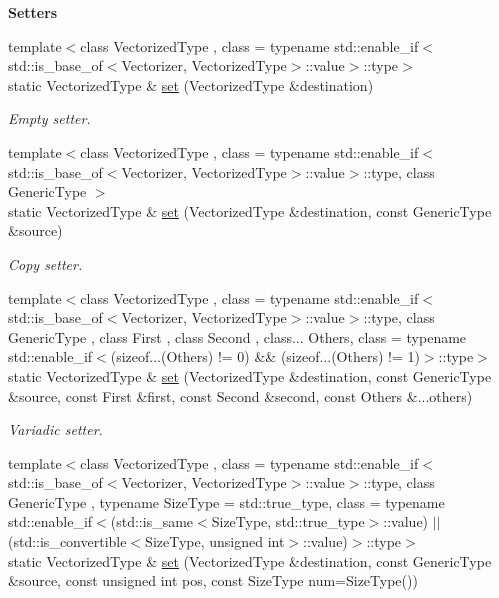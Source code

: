 \begin{Indent}{\bf Setters}\par
\begin{DoxyCompactItemize}
\item 
{\footnotesize template$<$class Vectorized\-Type , class  = typename std\-::enable\-\_\-if$<$std\-::is\-\_\-base\-\_\-of$<$\-Vectorizer, Vectorized\-Type$>$\-::value$>$\-::type$>$ }\\static Vectorized\-Type \& \hyperlink{classmagrathea_1_1Vectorizer_a67836bbf5aced8fee531fd2caf839f15}{set} (Vectorized\-Type \&destination)
\begin{DoxyCompactList}\small\item\em Empty setter. \end{DoxyCompactList}\item 
{\footnotesize template$<$class Vectorized\-Type , class  = typename std\-::enable\-\_\-if$<$std\-::is\-\_\-base\-\_\-of$<$\-Vectorizer, Vectorized\-Type$>$\-::value$>$\-::type, class Generic\-Type $>$ }\\static Vectorized\-Type \& \hyperlink{classmagrathea_1_1Vectorizer_aa586478d9b24b19586ff1d6dfdff5b68}{set} (Vectorized\-Type \&destination, const Generic\-Type \&source)
\begin{DoxyCompactList}\small\item\em Copy setter. \end{DoxyCompactList}\item 
{\footnotesize template$<$class Vectorized\-Type , class  = typename std\-::enable\-\_\-if$<$std\-::is\-\_\-base\-\_\-of$<$\-Vectorizer, Vectorized\-Type$>$\-::value$>$\-::type, class Generic\-Type , class First , class Second , class... Others, class  = typename std\-::enable\-\_\-if$<$(sizeof...(\-Others) != 0) \&\& (sizeof...(\-Others) != 1)$>$\-::type$>$ }\\static Vectorized\-Type \& \hyperlink{classmagrathea_1_1Vectorizer_ab181cd6d6a7afb777ebab551cc36bc33}{set} (Vectorized\-Type \&destination, const Generic\-Type \&source, const First \&first, const Second \&second, const Others \&...others)
\begin{DoxyCompactList}\small\item\em Variadic setter. \end{DoxyCompactList}\item 
{\footnotesize template$<$class Vectorized\-Type , class  = typename std\-::enable\-\_\-if$<$std\-::is\-\_\-base\-\_\-of$<$\-Vectorizer, Vectorized\-Type$>$\-::value$>$\-::type, class Generic\-Type , typename Size\-Type  = std\-::true\-\_\-type, class  = typename std\-::enable\-\_\-if$<$(std\-::is\-\_\-same$<$\-Size\-Type, std\-::true\-\_\-type$>$\-::value) $|$$|$ (std\-::is\-\_\-convertible$<$\-Size\-Type, unsigned int$>$\-::value)$>$\-::type$>$ }\\static Vectorized\-Type \& \hyperlink{classmagrathea_1_1Vectorizer_acccf60d696c7fdba17a8ff7bf0efa5de}{set} (Vectorized\-Type \&destination, const Generic\-Type \&source, const unsigned int pos, const Size\-Type num=Size\-Type())

\end{DoxyCompactItemize}
\end{Indent}
